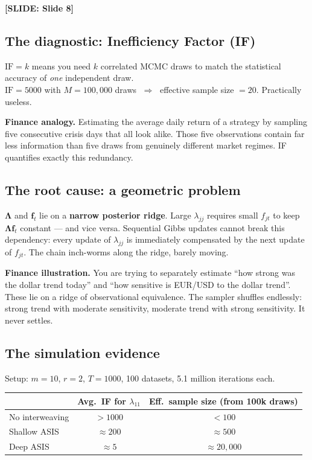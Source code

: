 \documentclass[11pt, a4paper]{article}\usepackage[]{graphicx}\usepackage[]{xcolor}
\newcommand{\slidetag}[1]{%
  \noindent\textcolor{MainBlue}{\footnotesize\textbf{[SLIDE: #1]}}%
  \vspace{0.2em}\par
}
\newcommand{\stress}[1]{\textbf{#1}}
\begin{document}
\slidetag{Slide 8}

\subsection{The diagnostic: Inefficiency Factor (IF)}

\begin{formulabox}
  $\mathrm{IF} = k$ means you need $k$ correlated MCMC draws to match
  the statistical accuracy of \textit{one} independent draw.\\[4pt]
  $\mathrm{IF} = 5000$ with $M = 100{,}000$ draws
  $\;\Rightarrow\;$ effective sample size $= 20$.
  Practically useless.
\end{formulabox}

\textbf{Finance analogy.}  Estimating the average daily return of a strategy
by sampling five consecutive crisis days that all look alike.  Those five
observations contain far less information than five draws from genuinely
different market regimes.  IF quantifies exactly this redundancy.

\subsection{The root cause: a geometric problem}

$\boldsymbol{\Lambda}$ and $\mathbf{f}_t$ lie on a \stress{narrow posterior
ridge}.  Large $\lambda_{jj}$ requires small $f_{jt}$ to keep
$\boldsymbol{\Lambda}\mathbf{f}_t$ constant --- and vice versa.  Sequential
Gibbs updates cannot break this dependency: every update of $\lambda_{jj}$ is
immediately compensated by the next update of $f_{jt}$.  The chain
inch-worms along the ridge, barely moving.

\textbf{Finance illustration.}  You are trying to separately estimate ``how
strong was the dollar trend today'' and ``how sensitive is EUR/USD to the
dollar trend''.  These lie on a ridge of observational equivalence.  The
sampler shuffles endlessly: strong trend with moderate sensitivity, moderate
trend with strong sensitivity.  It never settles.

\subsection{The simulation evidence}

Setup: $m = 10$, $r = 2$, $T = 1000$, 100 datasets, 5.1 million iterations
each.

\begin{center}
\begin{tabular}{lcc}
  \toprule
  & \textbf{Avg.\ IF for $\lambda_{11}$}
  & \textbf{Eff.\ sample size (from 100k draws)} \\
  \midrule
  No interweaving & $> 1000$ & $< 100$ \\
  Shallow ASIS    & $\approx 200$ & $\approx 500$ \\
  Deep ASIS       & $\approx 5$   & $\approx 20{,}000$ \\
  \bottomrule
\end{tabular}
\end{center}
\end{document}
